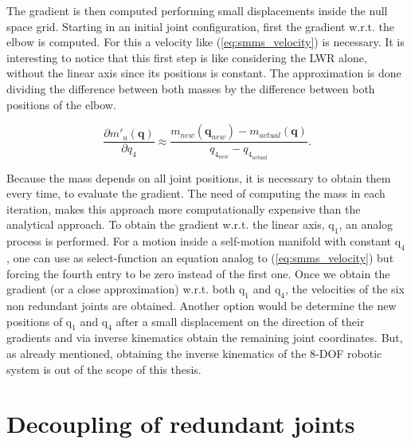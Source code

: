The gradient is then computed performing small displacements inside the null space grid. Starting in an initial joint configuration, first the gradient w.r.t. the elbow is computed. For this a velocity like (\ref{eq:smms_velocity}) is necessary. It is interesting to notice that this first step is like considering the LWR alone, without the linear axis since its positions is constant. The approximation is done dividing the difference between both  masses by the difference between both positions of the elbow. 



\begin{equation}
\frac{\partial {m'_u(\mathbf{q})}}{\partial {q_4}} \approx \frac{m_{new}(\mathbf{q}_{new}) - m_{actual}(\mathbf{q})}{ q_{4_{new}} - q_{4_{actual}}}.
\label{eq:approx_grad_q4}
\end{equation}



Because the mass depends on all joint positions, it is necessary to obtain them every time, to evaluate the gradient. The need of computing the mass in each iteration, makes this approach more computationally expensive than the analytical approach. To obtain the gradient w.r.t. the linear axis, $\mathrm{q_1}$, an analog process is performed. For a motion inside a self-motion manifold with constant $\mathrm{q_4}$, one can use as select-function an equation analog to (\ref{eq:smms_velocity}) but forcing the fourth entry to be zero instead of the first one. 
Once we obtain the gradient (or a close approximation) w.r.t. both $\mathrm{q_1}$ and $\mathrm{q_4}$, the velocities of the six non redundant joints are obtained. 
Another option would be determine the new positions of $\mathrm{q_1}$ and $\mathrm{q_4}$ after a small displacement on the direction of their gradients and via inverse kinematics obtain the remaining joint coordinates. But, as already mentioned, obtaining the inverse kinematics of the 8-DOF robotic system is out of the scope of this thesis.



\section{Decoupling of redundant joints}
\label{sec:Decoupling}
\label{subsubsec:weighting}



